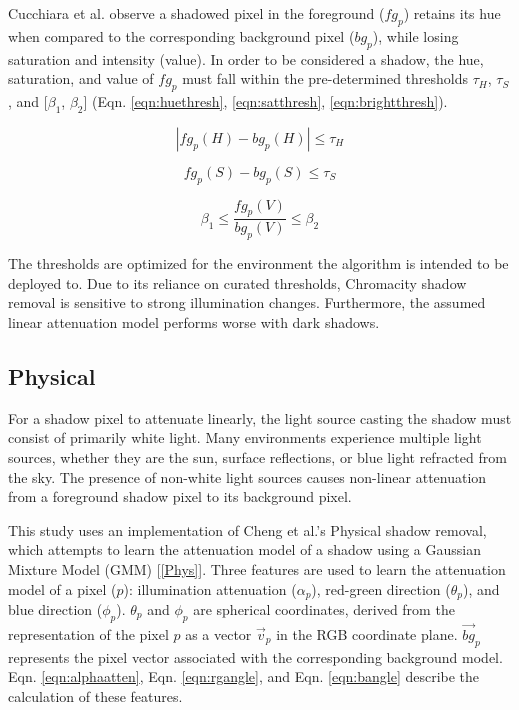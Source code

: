 \documentclass[12pt]{report}
\begin{document}
Cucchiara et al. observe a shadowed pixel in the foreground ($fg_{p}$) retains its hue when compared to the corresponding background pixel ($bg_{p}$), while losing saturation and intensity (value). In order to be considered a shadow, the hue, saturation, and value of $fg_{p}$ must fall within the pre-determined thresholds $\tau_{H}$, $\tau_{S}$, and [$\beta_{1}$, $\beta_{2}$] (Eqn. \ref{eqn:huethresh}, \ref{eqn:satthresh}, \ref{eqn:brightthresh}).

\begin{equation} \label{eqn:huethresh}
| fg_{p}(H) - bg_{p}(H) | \leq \tau_{H}
\end{equation}

\begin{equation} \label{eqn:satthresh}
fg_{p}(S) - bg_{p}(S) \leq \tau_{S}
\end{equation}

\begin{equation} \label{eqn:brightthresh}
\beta_{1} \leq \dfrac{fg_{p}(V)}{bg_{p}(V)} \leq \beta_{2}
\end{equation}

The thresholds are optimized for the environment the algorithm is intended to be deployed to. Due to its reliance on curated thresholds, Chromacity shadow removal is sensitive to strong illumination changes. Furthermore, the assumed linear attenuation model performs worse with dark shadows. 

\subsection{Physical}

For a shadow pixel to attenuate linearly, the light source casting the shadow must consist of primarily white light. Many environments experience multiple light sources, whether they are the sun, surface reflections, or blue light refracted from the sky. The presence of non-white light sources causes non-linear attenuation from a foreground shadow pixel to its background pixel.

This study uses an implementation of Cheng et al.'s Physical shadow removal, which attempts to learn the attenuation model of a shadow using a Gaussian Mixture Model (GMM) [\ref{Phys}]. Three features are used to learn the attenuation model of a pixel ($p$): illumination attenuation ($\alpha_{p}$), red-green direction ($\theta_{p}$), and blue direction ($\phi_{p}$). $\theta_{p}$ and $\phi_{p}$ are spherical coordinates, derived from the representation of the pixel $p$ as a vector $\vec{v}_{p}$ in the RGB coordinate plane. $\vec{bg}_{p}$ represents the pixel vector associated with the corresponding background model. Eqn. \ref{eqn:alphaatten}, Eqn. \ref{eqn:rgangle}, and Eqn. \ref{eqn:bangle} describe the calculation of these features.
\end{document}
